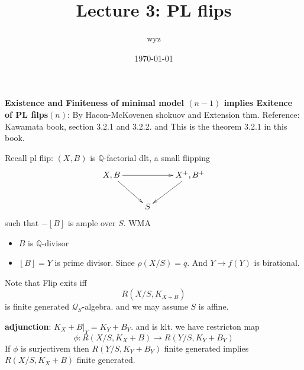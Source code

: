 \documentclass{article}
\title{Lecture 3: PL flips}
\author{wyz}
\date{\today}
\begin{document}
  \maketitle
\textbf{Existence and Finiteness of minimal model $(n-1)$ implies Exitence of PL filps$(n)$}: By Hacon-McKovenen shokuov and Extension thm. Reference: Kawamata book, section 3.2.1 and 3.2.2. and This is the theorem 3.2.1 in this book.

Recall  pl flip: $(X,B)$ is $\mathbb{Q}$-factorial dlt, a small flipping 
\[
  \xymatrix{
    X,B\ar[rd] \ar[rr] & & X^+,B^+\ar[ld] \\
    & S &
  }
\]
such that $ -\left\lfloor B \right\rfloor$ is ample over $S$.
WMA 
\begin{itemize}
  \item $B$ is $\mathbb{Q}$-divisor
  \item $\left\lfloor B \right\rfloor=Y$ is prime divisor. Since $\rho(X/S)= q$. And  $Y \to f(Y)$ is birational.
\end{itemize}
Note that Flip exits iff 
\[
  R(X/S,K_{X+B})
\]
is finite generated $\mathcal{Q}_{S}$-algebra. and we may assume $S$ is affine.

\textbf{adjunction}: $K_{X}+B|_{Y}=K_{Y}+B_{Y}$. and is klt.
we have restricton map
\[
  \phi:R(X/S,K_{X}+B) \to R(Y/S,K_{Y}+B_{Y})
\]
If  $\phi$ is surjectivem then $R(Y/S,K_{Y}+B_{Y})$ finite generated implies $R(X/S,K_{X}+B)$ finite generated.
\end{document}
